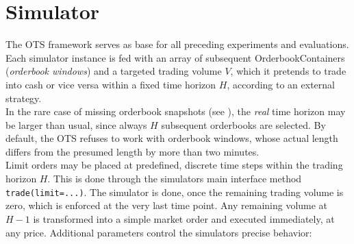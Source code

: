 \section{Simulator}
The \ac{OTS} framework serves as base for all preceding experiments and evaluations.
Each simulator instance is fed with an array of subsequent OrderbookContainers (\emph{orderbook windows}) and a targeted trading volume $V$, which it pretends to trade into cash or vice versa within a fixed time horizon $H$, according to an external strategy.\\

In the rare case of missing orderbook snapshots (see ), the \emph{real} time horizon may be larger than usual, since always $H$ subsequent orderbooks are selected. By default, the \ac{OTS} refuses to work with orderbook windows, whose actual length differs from the presumed length by more than two minutes.\\

Limit orders may be placed at predefined, discrete time steps within the trading horizon $H$. This is done through the simulators main interface method \lstinline!trade(limit=...)!. The simulator is done, once the remaining trading volume is zero, which is enforced at the very last time point. Any remaining volume at $H-1$ is transformed into a simple market order and executed immediately, at any price. Additional parameters control the simulators precise behavior:


